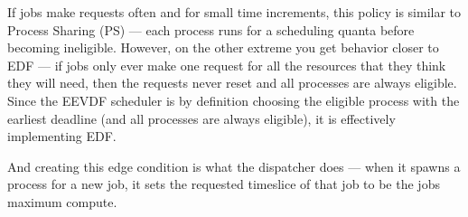 If jobs make requests often and for small time increments, this policy is
similar to Process Sharing (PS) --- each process runs for a scheduling quanta
before becoming ineligible. However, on the other extreme you get behavior
closer to EDF --- if jobs only ever make one request for all the resources that
they think they will need, then the requests never reset and all processes are
always eligible. Since the EEVDF scheduler is by definition choosing the
eligible process with the earliest deadline (and all processes are always
eligible), it is effectively implementing EDF.

And creating this edge condition is what the dispatcher does --- when it spawns
a process for a new job, it sets the requested timeslice of that job to be the
jobs maximum compute. 

